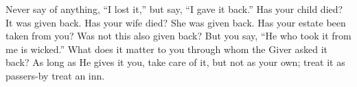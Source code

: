 Never say  of anything, ``I lost  it,'' but say,  ``I gave it back.''  Has your
child died? It was given back. Has your wife died? She was given back. Has your
estate been taken from you? Was not this also given back? But you say, ``He who
took it from me is wicked.'' What does  it matter to you through whom the Giver
asked it back?  As long as He  gives it you, take  care of it, but  not as your
own; treat it as passers-by treat an inn.
